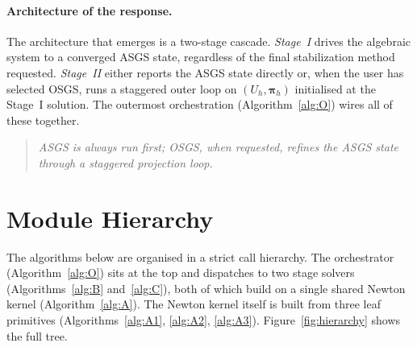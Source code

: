 \documentclass{article}
\begin{document}
\paragraph{Architecture of the response.}  The architecture that emerges
is a two-stage cascade. \emph{Stage~I} drives the algebraic system to a
converged ASGS state, regardless of the final stabilization method
requested. \emph{Stage~II} either reports the ASGS state directly or,
when the user has selected OSGS, runs a staggered outer loop on
$(U_h, \boldsymbol{\pi}_h)$ initialised at the Stage~I solution. The
outermost orchestration (Algorithm~\ref{alg:O}) wires all of these
together.

\begin{quote}
\itshape
ASGS is always run first; OSGS, when requested, refines the ASGS state
through a staggered projection loop.
\end{quote}

\section{Module Hierarchy}
\label{sec:tree}

The algorithms below are organised in a strict call hierarchy. The
orchestrator (Algorithm~\ref{alg:O}) sits at the top and dispatches to
two stage solvers (Algorithms~\ref{alg:B} and~\ref{alg:C}), both of
which build on a single shared Newton kernel
(Algorithm~\ref{alg:A}). The Newton kernel itself is built from three
leaf primitives (Algorithms~\ref{alg:A1}, \ref{alg:A2}, \ref{alg:A3}).
Figure~\ref{fig:hierarchy} shows the full tree.
\end{document}
